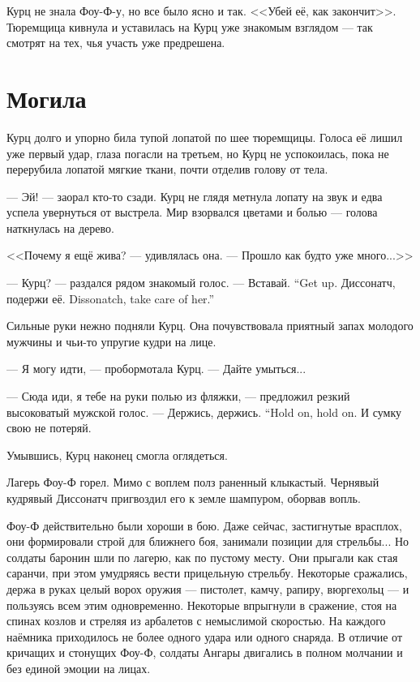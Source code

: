 Курц не знала Фоу-Ф-у, но все было ясно и так.
<<Убей её, как закончит>>.
Тюремщица кивнула и уставилась на Курц уже знакомым взглядом --- так смотрят на тех, чья участь уже предрешена.

\section{Могила}

Курц долго и упорно била тупой лопатой по шее тюремщицы.
Голоса её лишил уже первый удар, глаза погасли на третьем, но Курц не успокоилась, пока не перерубила лопатой мягкие ткани, почти отделив голову от тела.

--- Эй! --- заорал кто-то сзади.
Курц не глядя метнула лопату на звук и едва успела увернуться от выстрела.
Мир взорвался цветами и болью --- голова наткнулась на дерево.

<<Почему я ещё жива? --- удивлялась она.
--- Прошло как будто уже много...>>

--- Курц? --- раздался рядом знакомый голос.
{--- Вставай.}
{``Get up.}
{Диссонатч, подержи её.}
{Dissonatch, take care of her.''}

Сильные руки нежно подняли Курц.
Она почувствовала приятный запах молодого мужчины и чьи-то упругие кудри на лице.

--- Я могу идти, --- пробормотала Курц.
--- Дайте умыться...

--- Сюда иди, я тебе на руки полью из фляжки, --- предложил резкий высоковатый мужской голос.
{--- Держись, держись.}
{``Hold on, hold on.}
И сумку свою не потеряй.

Умывшись, Курц наконец смогла оглядеться.

Лагерь Фоу-Ф горел.
Мимо с воплем полз раненный клыкастый.
Чернявый кудрявый Диссонатч пригвоздил его к земле шампуром, оборвав вопль.

Фоу-Ф действительно были хороши в бою.
Даже сейчас, застигнутые врасплох, они формировали строй для ближнего боя, занимали позиции для стрельбы...
Но солдаты баронин шли по лагерю, как по пустому месту.
Они прыгали как стая саранчи, при этом умудряясь вести прицельную стрельбу.
Некоторые сражались, держа в руках целый ворох оружия --- пистолет, камчу, рапиру, вюргехольц --- и пользуясь всем этим одновременно.
Некоторые впрыгнули в сражение, стоя на спинах козлов и стреляя из арбалетов с немыслимой скоростью.
На каждого наёмника приходилось не более одного удара или одного снаряда.
В отличие от кричащих и стонущих Фоу-Ф, солдаты Ангары двигались в полном молчании и без единой эмоции на лицах.

